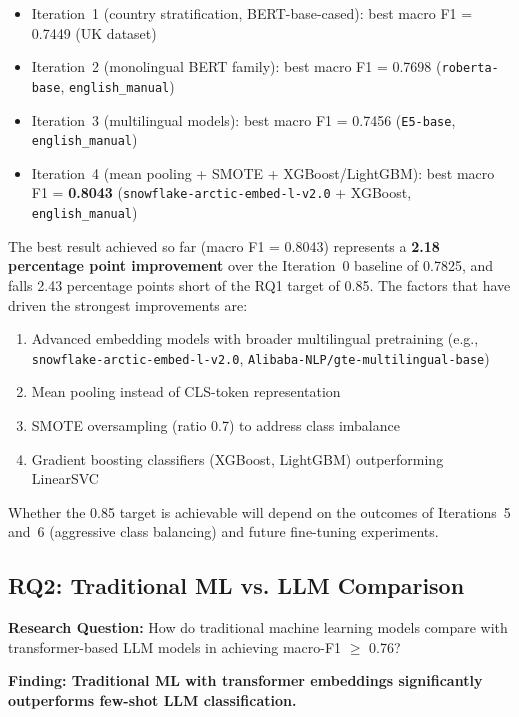 \documentclass[11pt, titlepage, bibliography=totoc]{scrreprt}
\begin{document}
\begin{itemize}
    \item Iteration~1 (country stratification, BERT-base-cased): best macro F1 = 0.7449 (UK dataset)
    \item Iteration~2 (monolingual BERT family): best macro F1 = 0.7698 (\texttt{roberta-base}, \texttt{english\_manual})
    \item Iteration~3 (multilingual models): best macro F1 = 0.7456 (\texttt{E5-base}, \texttt{english\_manual})
    \item Iteration~4 (mean pooling + SMOTE + XGBoost/LightGBM): best macro F1 = \textbf{0.8043} (\texttt{snowflake-arctic-embed-l-v2.0} + XGBoost, \texttt{english\_manual})
\end{itemize}

The best result achieved so far (macro F1 = 0.8043) represents a \textbf{2.18 percentage point improvement} over the Iteration~0 baseline of 0.7825, and falls 2.43 percentage points short of the RQ1 target of 0.85. The factors that have driven the strongest improvements are:

\begin{enumerate}
    \item Advanced embedding models with broader multilingual pretraining (e.g., \texttt{snowflake-arctic-embed-l-v2.0}, \texttt{Alibaba-NLP/gte-multilingual-base})
    \item Mean pooling instead of CLS-token representation
    \item SMOTE oversampling (ratio 0.7) to address class imbalance
    \item Gradient boosting classifiers (XGBoost, LightGBM) outperforming LinearSVC
\end{enumerate}

Whether the 0.85 target is achievable will depend on the outcomes of Iterations~5 and~6 (aggressive class balancing) and future fine-tuning experiments.

\subsection{RQ2: Traditional ML vs. LLM Comparison}

\textbf{Research Question:} How do traditional machine learning models compare with transformer-based LLM models in achieving macro-F1 $\geq$ 0.76?

\textbf{Finding: Traditional ML with transformer embeddings significantly outperforms few-shot LLM classification.}
\end{document}
